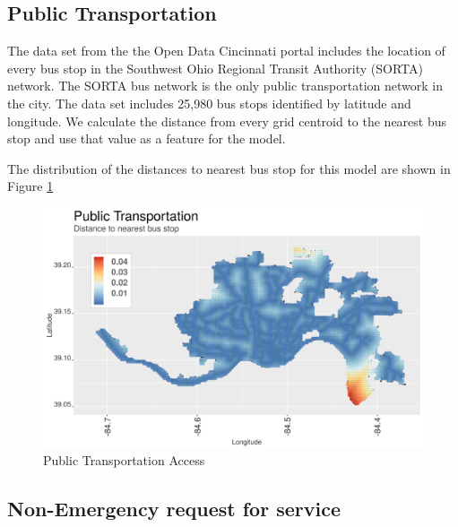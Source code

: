 \documentclass{llncs}
\begin{document}

\subsection{Public Transportation}

The data set from the the Open Data Cincinnati portal  includes the location of every bus stop in the  Southwest Ohio Regional Transit Authority (SORTA) network. The SORTA bus network is the only public transportation network in the city. The data set includes 25,980 bus stops identified by latitude and longitude. We calculate the distance from every grid centroid to the nearest bus stop and use that value as a feature for the model. 

The distribution of the distances to nearest bus stop for this model are shown in Figure \ref{figure : busStopDistances}

\FloatBarrier
\begin{figure}
 	\includegraphics[width=\textwidth, height=\textheight, keepaspectratio]{busStopDistances}
 	\caption{Public Transportation Access}
	\label{figure : busStopDistances}
\end{figure}
\FloatBarrier


\subsection{Non-Emergency request for service}
\end{document}
